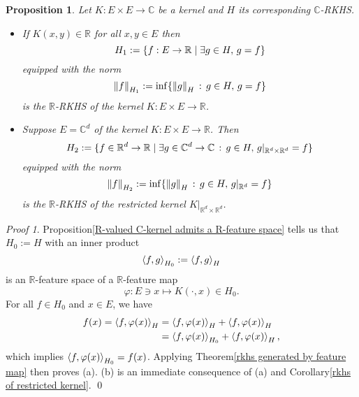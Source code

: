 \documentclass[a4paper,12pt]{article}
\newtheorem{prp}[thm]{Proposition}
\theoremstyle{remark}
\newtheorem*{prf}{Proof}
\theoremstyle{definition}
\theoremstyle{definition}
\theoremstyle{definition}
\newcommand{\ip}[2]{\left<#1, #2 \right>}
\newcommand{\norm}[1]{\left\| #1 \right\|}
\let\Re\relax
\DeclareMathOperator{\Re}{Re}
\let\Im\relax
\DeclareMathOperator{\Im}{Im}
\begin{document}
\begin{prp}
	Let \( K: E \times E \to \mathbb{C} \) be a kernel and \( H \) its corresponding \( \mathbb{C} \)-RKHS.
	\begin{itemize}
		\item[(a)] If \( K(x,y) \in \mathbb{R} \) for all \( x, y \in E \) then
		      \begin{equation*}
			      H_1:=\{f:E \to \mathbb{R} \mid \exists g \in H,\,\Re g = f\}
		      \end{equation*}
		      equipped with the norm
		      \begin{equation*}
			      \norm{f}_{H_1} := \inf \{\norm{g}_H\,:\, g \in H,\,\Re g = f\}
		      \end{equation*}
		      is the \( \mathbb{R} \)-RKHS of the kernel \( K:E \times E \to \mathbb{R} \).

		\item[(b)] Suppose \( E =\mathbb{C}^d \) of the kernel \( K:E \times E \to \mathbb{R} \). Then
		      \begin{equation*}
			      H_2:=\{f \in \mathbb{R}^d \to \mathbb{R} \mid \exists g \in \mathbb{C}^d \to \mathbb{C}\,:\, g \in H,\,\Re g|_{\mathbb{R}^d \times \mathbb{R}^d} =f \}
		      \end{equation*}
		      equipped with the norm
		      \begin{equation*}
			      \norm{f}_{H_2} := \inf \{\norm{g}_H \,:\, g \in H,\,\Re g|_{\mathbb{R}^d}=f\}
		      \end{equation*}
		      is the \( \mathbb{R} \)-RKHS of the restricted kernel \( K|_{\mathbb{R}^d \times \mathbb{R}^d} \).
	\end{itemize}
\end{prp}
\begin{prf}
	Proposition\ref{R-valued C-kernel admits a R-feature space} tells us that \( H_0:=H \) with an inner product
	\begin{equation*}
		\ip{f}{g}_{H_0}:= \Re \ip{f}{g}_H
	\end{equation*}
	is an \( \mathbb{R} \)-feature space of a \( \mathbb{R} \)-feature map
	\begin{equation*}
		\varphi:E \ni x \mapsto K(\cdot ,x) \in H_0.
	\end{equation*}
	For all \( f \in H_0 \) and \( x \in E \), we have
	\begin{equation*}
		\begin{aligned}
			f(x) = \ip{f}{\varphi(x)}_H
			 & = \Re \ip{f}{\varphi(x)}_H + \Im \ip{f}{\varphi(x)}_H  \\
			 & = \ip{f}{\varphi(x)}_{H_0} + \Im \ip{f}{\varphi(x)}_H,
		\end{aligned}
	\end{equation*}
	which implies \( \ip{f}{\varphi(x)}_{H_0}= \Re f(x) \). Applying Theorem\ref{rkhs generated by feature map} then proves (a). (b) is an immediate consequence of (a) and Corollary\ref{rkhs of restricted kernel}.
	\qed\end{prf}
\end{document}
